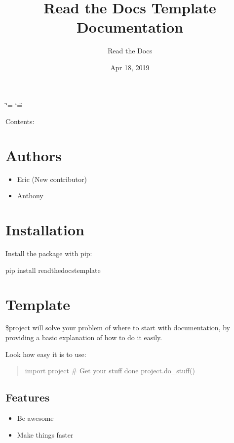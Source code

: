 \documentclass[letterpaper,10pt,english]{sphinxmanual}
\title{Read the Docs Template Documentation}
\date{Apr 18, 2019}
\author{Read the Docs}
\begin{document}
\ifdefined\shorthandoff
  \ifnum\catcode`\=\string=\active\shorthandoff{=}\fi
  \ifnum\catcode`\"=\active{}\fi
\fi

\pagestyle{empty}
\sphinxmaketitle
\pagestyle{plain}
\sphinxtableofcontents
\pagestyle{normal}
\label{\detokenize{index::doc}}


Contents:


\chapter{Authors}
\label{\detokenize{authors:authors}}\label{\detokenize{authors::doc}}\begin{itemize}
\item {} 
Eric (New contributor)

\item {} 
Anthony

\end{itemize}


\chapter{Installation}
\label{\detokenize{installation:installation}}\label{\detokenize{installation::doc}}
Install the package with pip:

\begin{sphinxVerbatim}[commandchars=\\\{\}]
\PYGZdl{} pip install read\PYGZhy{}the\PYGZhy{}docs\PYGZhy{}template
\end{sphinxVerbatim}


\chapter{Template}
\label{\detokenize{readme:template}}\label{\detokenize{readme::doc}}
\$project will solve your problem of where to start with documentation,
by providing a basic explanation of how to do it easily.

Look how easy it is to use:
\begin{quote}

import project
\# Get your stuff done
project.do\_stuff()
\end{quote}


\section{Features}
\label{\detokenize{readme:features}}\begin{itemize}
\item {} 
Be awesome

\item {} 
Make things faster

\end{itemize}
\end{document}
